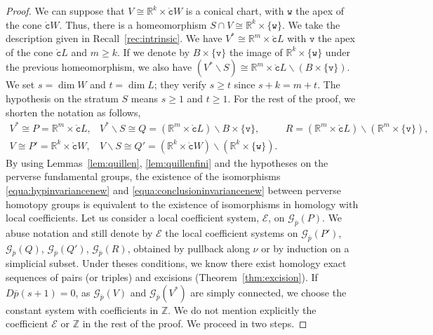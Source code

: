\documentclass[a4paper,10pt,english,reqno]{amsart}
\theoremstyle{plain}
\theoremstyle{definition}
\theoremstyle{remark}
\numberwithin{equation}{section}
\newcommand{\thmref}[1]{Theorem~\ref{#1}}
\def\R{{\mathbb R}}
\def\ov{\overline}
\def\cE{{\mathcal E}}
\def\crG{{\mathscr G}}
\def\tc{{\mathtt c}}
\def\tv{{\mathtt v}}
\def\tw{{\mathtt w}}
\def\R{\mathbb{R}}
\def\Z{\mathbb{Z}}
\def\rc{{\mathring{\tc}}}
\def\menos{\backslash}
\renewcommand\1{\hbox{\ding{192}}}
\renewcommand\2{\hbox{\ding{193}}}
\newcommand\3{\hbox{\ding{194}}}
\newcommand\4{\hbox{\ding{195}}}
\begin{document}
%
\begin{proof}
We can suppose  that $V\cong \R^k\times \rc W$ is a conical chart, with $\tw$ the apex of the cone $\rc W$. 
Thus, there is a homeomorphism $S\cap V\cong \R^k\times \{\tw\}$.
We take  the description  given in Recall~\ref{rec:intrinsic}.
%
We have $V^*\cong\R^m\times \rc L$ with $\tv$ the apex of the cone $\rc L$ and $m\geq k$. 
If we denote by $B\times \{\tv\}$ the image of $\R^k\times \{\tw\}$ under the previous homeomorphism, we also have $(V^*\menos S)\cong\R^m\times \rc L\menos (B\times \{\tv\})$.
We set $s=\dim W$ and $t=\dim L$; they verify $s\geq t$ since $s+k=m+t$.
The hypothesis on the stratum $S$  means $s\geq 1$ and $t\geq 1$.
%
For the rest of the proof, we shorten the notation as follows,
$$
\begin{array}{lll}
 V^*\cong P=\R^m\times \rc L, &  V^*\menos S\cong Q=(\R^m\times \rc L)\menos B\times \{\tv\}, &   R=(\R^m\times \rc L)\menos (\R^m\times\{\tv\}),\\
  V\cong P'=\R^k\times \rc W, &  V\menos S\cong Q'=(\R^k\times \rc W)\menos (\R^k\times \{\tw\}). &
\end{array}
$$
%
%
By using Lemmas~\ref{lem:quillen}, \ref{lem:quillenfini} and the hypotheses on the perverse fundamental groups,
the existence of the isomorphisms \eqref{equa:hypinvariancenew} and \eqref{equa:conclusioninvariancenew}
between perverse homotopy groups is equivalent to the existence of isomorphisms in homology with local coefficients.
%
%
Let us consider a local coefficient system, $\cE$, on $\crG_{\ov{p}}(P)$. 
We abuse notation and still denote by $\cE$ the local coefficient systems on 
$\crG_{\ov{p}}(P')$, $\crG_{\ov{p}}(Q)$, $\crG_{\ov{p}}(Q')$, $\crG_{\ov{p}}(R)$,
obtained by pullback along $\nu$ or by induction on a simplicial subset.
Under theses conditions, we know there exist homology exact sequences of pairs (or triples) and excisions (\thmref{thm:excision}).
%
If $D\ov{p}(s+1)=0$, as $\crG_{\ov{p}}(V)$ and $\crG_{\ov{p}}(V^*)$ are simply connected, we  choose 
the constant system with coefficients in $\Z$.
We do not mention explicitly the coefficient $\cE$ or $\Z$ in the rest of the proof.
We proceed in two steps.



\end{proof}
\end{document}
